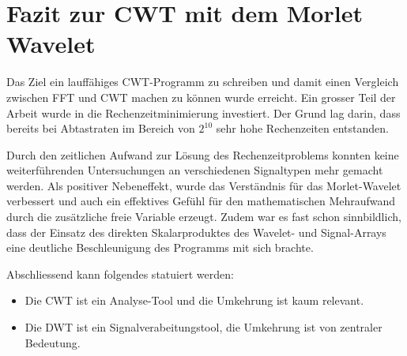 %
%
%
%
\section{Fazit zur CWT mit dem Morlet Wavelet
	\label{wavelets:section:teil6}}

Das Ziel ein lauffähiges CWT-Programm zu schreiben und damit einen Vergleich zwischen FFT und CWT machen zu können wurde erreicht. Ein grosser Teil der Arbeit wurde in die Rechenzeitminimierung investiert. Der Grund lag darin, dass bereits bei Abtastraten im Bereich von $2^{10}$ sehr hohe Rechenzeiten entstanden.

Durch den zeitlichen Aufwand zur Lösung des Rechenzeitproblems konnten keine weiterführenden Untersuchungen an verschiedenen Signaltypen mehr gemacht werden. Als positiver Nebeneffekt, wurde das Verständnis für das Morlet-Wavelet verbessert und auch ein effektives Gefühl für den mathematischen Mehraufwand durch die zusätzliche freie Variable erzeugt. Zudem war es fast schon sinnbildlich, dass der Einsatz des direkten Skalarproduktes des Wavelet- und Signal-Arrays eine deutliche Beschleunigung des Programms mit sich brachte. 


Abschliessend kann folgendes statuiert werden:

\begin{itemize}
		\item Die CWT ist ein Analyse-Tool und die Umkehrung ist kaum relevant.
		\item Die DWT ist ein Signalverabeitungstool, die Umkehrung ist von zentraler Bedeutung.
\end{itemize}